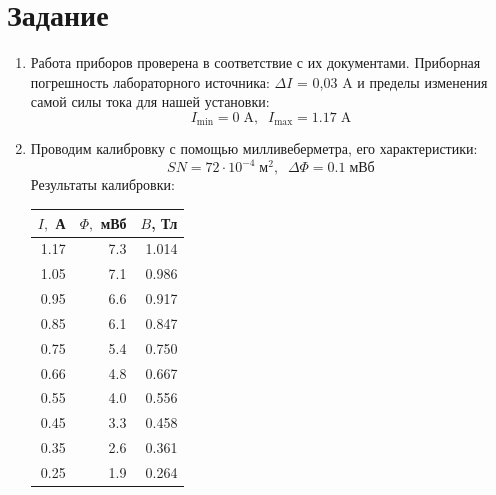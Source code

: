 \documentclass[a4paper,12pt]{extarticle}
\begin{document}
\section*{Задание}
\begin{enumerate}
    \item Работа приборов проверена в соответствие с их документами. Приборная погрешность лабораторного источника: $\Delta I$ = 0,03 A и пределы изменения самой силы тока для нашей установки: 
    $$I_{\text{min}} = 0 \;\text{A},\;\; I_{\text{max}} = 1.17 \;\text{A}$$
    \item Проводим калибровку с помощью милливеберметра, его характеристики: 
    $$SN = 72\cdot10^{-4}\;\text{м}^2,\;\;\Delta \Phi = 0.1\;\text{мВб}$$
    Результаты калибровки: \\
    \begin{minipage}{0.3\textwidth}
    \begin{tabular}{|r|r|r|}
    \hline
    \multicolumn{1}{|l|}{$I,$  А} & \multicolumn{1}{l|}{$\Phi,$ мВб} & \multicolumn{1}{l|}{$B$, Тл} \\ \hline
    1.17                          & 7.3                              & 1.014                        \\ \hline
    1.05                          & 7.1                              & 0.986                        \\ \hline
    0.95                          & 6.6                              & 0.917                        \\ \hline
    0.85                          & 6.1                              & 0.847                        \\ \hline
    0.75                          & 5.4                              & 0.750                        \\ \hline
    0.66                          & 4.8                              & 0.667                        \\ \hline
    0.55                          & 4.0                              & 0.556                        \\ \hline
    0.45                          & 3.3                              & 0.458                        \\ \hline
    0.35                          & 2.6                              & 0.361                        \\ \hline
    0.25                          & 1.9                              & 0.264                        \\ \hline

\end{tabular}
\end{minipage}
\end{enumerate}
\end{document}
